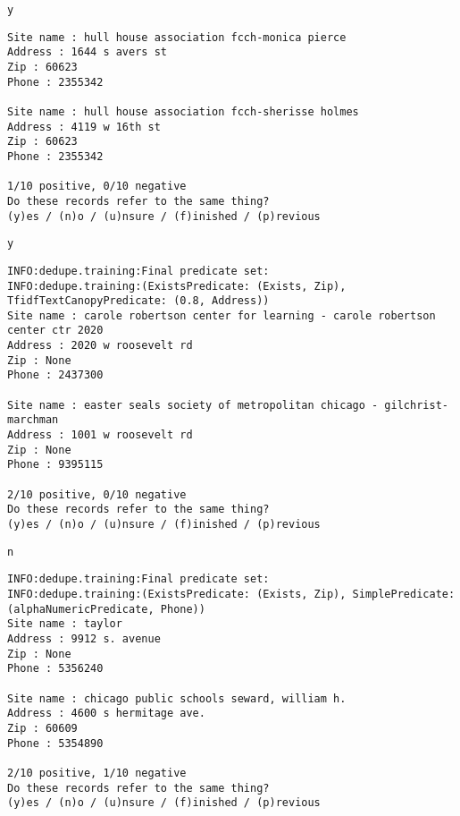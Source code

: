 \documentclass[11pt]{article}
\begin{document}
    \begin{Verbatim}[commandchars=\\\{\}]
y

    \end{Verbatim}

    \begin{Verbatim}[commandchars=\\\{\}]
Site name : hull house association fcch-monica pierce
Address : 1644 s avers st
Zip : 60623
Phone : 2355342

Site name : hull house association fcch-sherisse holmes
Address : 4119 w 16th st
Zip : 60623
Phone : 2355342

1/10 positive, 0/10 negative
Do these records refer to the same thing?
(y)es / (n)o / (u)nsure / (f)inished / (p)revious

    \end{Verbatim}

    \begin{Verbatim}[commandchars=\\\{\}]
y

    \end{Verbatim}

    \begin{Verbatim}[commandchars=\\\{\}]
INFO:dedupe.training:Final predicate set:
INFO:dedupe.training:(ExistsPredicate: (Exists, Zip), TfidfTextCanopyPredicate: (0.8, Address))
Site name : carole robertson center for learning - carole robertson center ctr 2020
Address : 2020 w roosevelt rd
Zip : None
Phone : 2437300

Site name : easter seals society of metropolitan chicago - gilchrist-marchman
Address : 1001 w roosevelt rd
Zip : None
Phone : 9395115

2/10 positive, 0/10 negative
Do these records refer to the same thing?
(y)es / (n)o / (u)nsure / (f)inished / (p)revious

    \end{Verbatim}

    \begin{Verbatim}[commandchars=\\\{\}]
n

    \end{Verbatim}

    \begin{Verbatim}[commandchars=\\\{\}]
INFO:dedupe.training:Final predicate set:
INFO:dedupe.training:(ExistsPredicate: (Exists, Zip), SimplePredicate: (alphaNumericPredicate, Phone))
Site name : taylor
Address : 9912 s. avenue
Zip : None
Phone : 5356240

Site name : chicago public schools seward, william h.
Address : 4600 s hermitage ave.
Zip : 60609
Phone : 5354890

2/10 positive, 1/10 negative
Do these records refer to the same thing?
(y)es / (n)o / (u)nsure / (f)inished / (p)revious

    \end{Verbatim}
\end{document}
